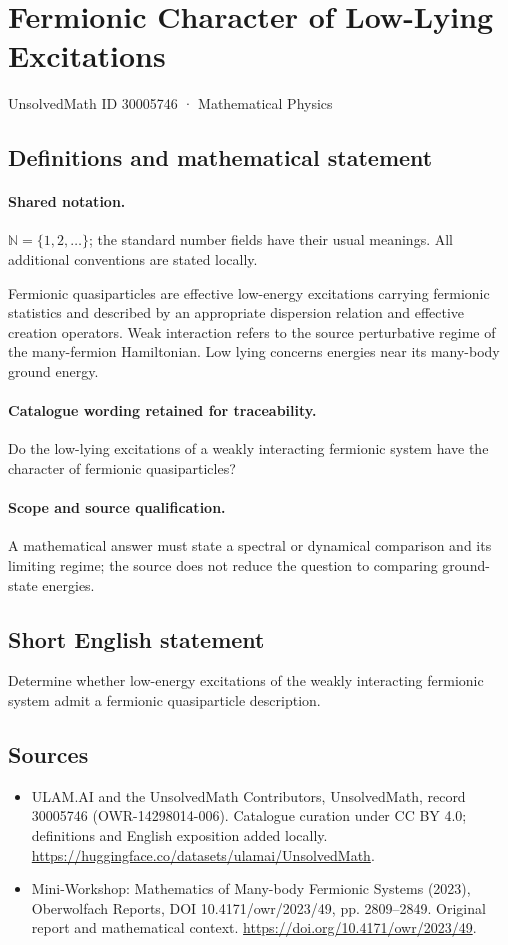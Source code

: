 \documentclass[11pt]{article}
\begin{document}
\setcounter{section}{30005745}
\section{Fermionic Character of Low-Lying Excitations}\label{30005746}
{\small UnsolvedMath ID 30005746 · Mathematical Physics}
\subsection{Definitions and mathematical statement}

\paragraph{Shared notation.}$\mathbb N=\{1,2,\ldots\}$; the standard number fields have their usual meanings. All additional conventions are stated locally.


Fermionic quasiparticles are effective low-energy excitations carrying fermionic statistics and described by an appropriate dispersion relation and effective creation operators. Weak interaction refers to the source perturbative regime of the many-fermion Hamiltonian. Low lying concerns energies near its many-body ground energy.

\paragraph{Catalogue wording retained for traceability.}
Do the low-lying excitations of a weakly interacting fermionic system have the character of fermionic quasiparticles?

\paragraph{Scope and source qualification.}A mathematical answer must state a spectral or dynamical comparison and its limiting regime; the source does not reduce the question to comparing ground-state energies.
\subsection{Short English statement}
Determine whether low-energy excitations of the weakly interacting fermionic system admit a fermionic quasiparticle description.
\subsection{Sources}
\begin{itemize}
\item[\hypertarget{source:30005746:1}{S1}] ULAM.AI and the UnsolvedMath Contributors, UnsolvedMath, record 30005746 (OWR-14298014-006). Catalogue curation under CC BY 4.0; definitions and English exposition added locally.
\url{https://huggingface.co/datasets/ulamai/UnsolvedMath}.
\item[\hypertarget{source:30005746:2}{S2}] Mini-Workshop: Mathematics of Many-body Fermionic Systems (2023), Oberwolfach Reports, DOI 10.4171/owr/2023/49, pp. 2809--2849. Original report and mathematical context.
\url{https://doi.org/10.4171/owr/2023/49}.
\end{itemize}
\label{end:30005746}
\end{document}
